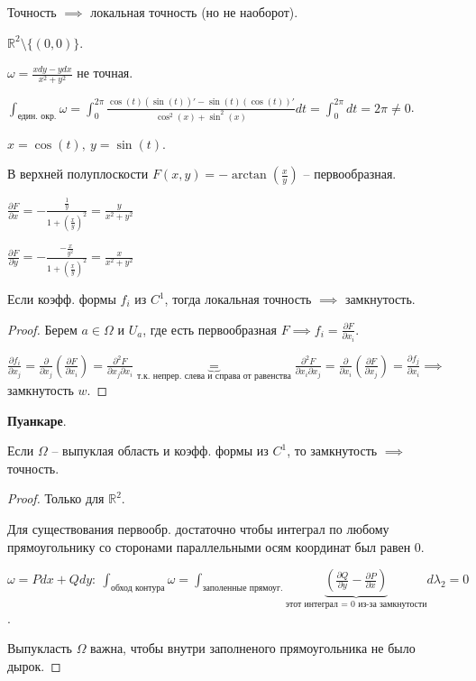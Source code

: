 \begin{remark}
    Точность $\implies$ локальная точность (но не наоборот).

    $\mathbb{R}^2 \setminus \{( 0, 0 )\}$.

    $\omega = \frac{x dy - y dx}{x^2 + y^2}$ не точная.

    $\int_{\text{един. окр.}} { \omega } = \int_{0}^{2\pi} { \frac{\cos(t) (\sin(t))' - \sin(t) (\cos(t))'}{\cos^2(x) + \sin^2(x)} dt} = \int_{0}^{2\pi} { dt } = 2\pi \not = 0$.

    $x = \cos(t), \ y = \sin(t)$.

    В верхней полуплоскости $F(x, y) = -\arctan\left(\frac{x}{y}\right)$ -- первообразная.

    $\frac{\partial F}{\partial x} = - \frac{\frac{1}{y}}{1 + (\frac{x}{y})^2} = \frac{y}{x^2 + y^2}$

    $\frac{\partial F}{\partial y} = - \frac{-\frac{x}{y^2}}{1 + (\frac{x}{y})^2} = \frac{x}{x^2 + y^2}$
\end{remark}

\begin{theorem}
    Если коэфф. формы $f_i$ из $C^1$, тогда локальная точность $\implies$ замкнутость.
\end{theorem}
\begin{proof}
    Берем $a \in \Omega$ и $U_a$, где есть первообразная $F \implies f_i = \frac{\partial F}{\partial x_i}$.

    $\frac{\partial f_i}{\partial x_j} = \frac{\partial}{\partial x_j} (\frac{\partial F}{\partial x_i}) = \frac{\partial^2 F}{\partial x_j \partial x_i} \underbrace{=}_{\text{т.к. непрер. слева и справа от равенства}} \frac{\partial^2 F}{\partial x_i \partial x_j} = \frac{\partial}{\partial x_i} \left( \frac{\partial F}{\partial x_j} \right) = \frac{\partial f_j}{\partial x_i} \implies$ замкнутость $w$.
\end{proof}

\begin{lemma}
    \textbf{Пуанкаре}.

    Если $\Omega$ -- выпуклая область и коэфф. формы из $C^1$, то замкнутость $\implies$ точность.
\end{lemma}
\begin{proof}
    Только для $\mathbb{R}^2$.

    Для существования первообр. достаточно чтобы интеграл по любому прямоугольнику со сторонами параллельными осям координат был равен 0.
    
    $\omega = P dx + Q dy: \ \int_{\text{обход контура}} { \omega } = \int_{\text{заполенные прямоуг.}} { \underbrace{(\frac{\partial Q}{\partial y} - \frac{\partial P}{\partial x})}_{\text{этот интеграл = 0 из-за замкнутости}} d \lambda_2} = 0$.

    Выпукласть $\Omega$ важна, чтобы внутри заполненого прямоугольника не было дырок.
\end{proof}

